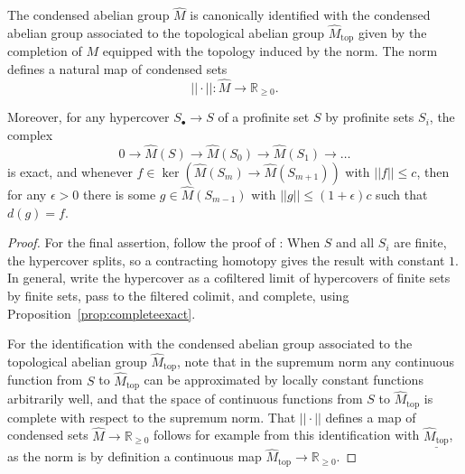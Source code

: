 \begin{proposition}\label{prop:normedcompletion} The condensed abelian group $\widehat{M}$ is canonically identified with the condensed abelian group associated to the topological abelian group $\widehat{M}_{\mathrm{top}}$ given by the completion of $M$ equipped with the topology induced by the norm. The norm defines a natural map of condensed sets
\[
||\cdot||: \widehat{M}\to \mathbb R_{\geq 0}.
\]

Moreover, for any hypercover $S_\bullet\to S$ of a profinite set $S$ by profinite sets $S_i$, the complex
\[
0\to \widehat{M}(S)\to \widehat{M}(S_0)\to \widehat{M}(S_1)\to \ldots
\]
is exact, and whenever $f\in \ker(\widehat{M}(S_m)\to \widehat{M}(S_{m+1}))$ with $||f||\leq c$, then for any $\epsilon>0$ there is some $g\in \widehat{M}(S_{m-1})$ with $||g||\leq (1+\epsilon)c$ such that $d(g)=f$.
\end{proposition}

\begin{proof} For the final assertion, follow the proof of \cite[Theorem 3.3]{Condensed}: When $S$ and all $S_i$ are finite, the hypercover splits, so a contracting homotopy gives the result with constant $1$. In general, write the hypercover as a cofiltered limit of hypercovers of finite sets by finite sets, pass to the filtered colimit, and complete, using Proposition~\ref{prop:completeexact}.

For the identification with the condensed abelian group associated to the topological abelian group $\widehat{M}_{\mathrm{top}}$, note that in the supremum norm any continuous function from $S$ to $\widehat{M}_{\mathrm{top}}$ can be approximated by locally constant functions arbitrarily well, and that the space of continuous functions from $S$ to $\widehat{M}_{\mathrm{top}}$ is complete with respect to the supremum norm. That $||\cdot||$ defines a map of condensed sets $\widehat{M}\to \mathbb R_{\geq 0}$ follows for example from this identification with $\underline{\widehat{M}_{\mathrm{top}}}$, as the norm is by definition a continuous map $\widehat{M}_{\mathrm{top}}\to \mathbb R_{\geq 0}$.
\end{proof}










